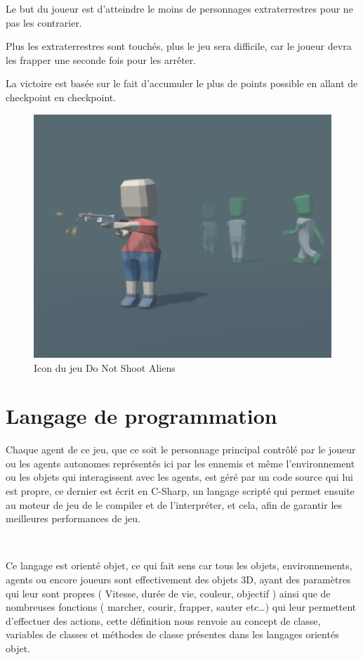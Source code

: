 Le but du joueur est d’atteindre le moins de personnages extraterrestres pour ne pas les contrarier.

Plus les extraterrestres sont touchés, plus le jeu sera difficile, car le joueur devra les frapper une seconde fois pour les arrêter. 

La victoire est basée sur le fait d’accumuler le plus de points possible en allant de checkpoint en checkpoint.

\begin{figure}[th]
\centering
\includegraphics{Figures/72unity.JPG}
\decoRule
\caption[Icon du jeu]{Icon du jeu Do Not Shoot Aliens}
\label{fig:7.2}
\end{figure}

\section{Langage de programmation}

Chaque agent de ce jeu, que ce soit le personnage principal contrôlé par le joueur ou les agents autonomes représentés ici par les ennemis et même l’environnement ou les objets qui interagissent avec les agents, est géré par un code source qui lui est propre, ce dernier est écrit en C-Sharp, un langage scripté qui permet ensuite au moteur de jeu de le compiler et de l'interpréter, et cela, afin de garantir les meilleures performances de jeu.

~\par
Ce langage est orienté objet, ce qui fait sens car tous les objets, environnements, agents ou encore joueurs sont effectivement des objets 3D, ayant des paramètres qui leur sont propres ( Vitesse, durée de vie, couleur, objectif ) ainsi que de nombreuses fonctions ( marcher, courir, frapper, sauter etc…) qui leur permettent d’effectuer des actions, cette définition nous renvoie au concept de classe, variables de classes et méthodes de classe présentes dans les langages orientés objet.


